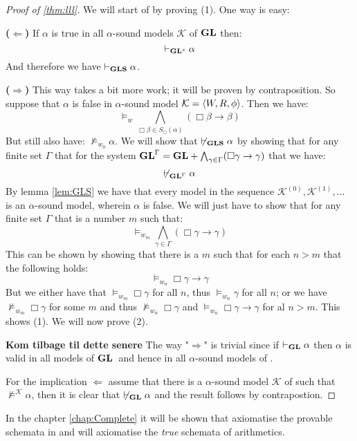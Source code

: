 \documentclass[../main.tex]{subfiles}
\begin{document}
\begin{proof}[Proof of \ref{thm:lll}]
	We will start of by proving (1). One way is easy:

	\textbf{($\Leftarrow$)} If $\alpha$ is true in all $\alpha$-sound
	models $\mathcal{K}$ of $\text{\textbf{GL}}$ then:
	$$\vdash_{\text{\textbf{GL}}^s}\alpha$$
	And therefore we have $\vdash_{\text{\textbf{GLS}}}\alpha$.

	\textbf{($\Rightarrow$)} This way takes a bit more work; it will be
	proven by contraposition. So suppose that $\alpha$ is false in
	$\alpha$-sound model $\mathcal{K}=\langle W,R,\phi\rangle$. Then we have:
	$$\vDash_w\bigwedge_{\Box\beta\in
	S_\Box(\alpha)}(\Box\beta\rightarrow\beta)$$
	But still also have: $\not\vDash_{w_0}\alpha$. We will show that
	$\not\vdash_{\text{\textbf{GLS}}}\alpha$ by showing that for any finite set $\Gamma$
	that for the system
	$\text{\textbf{GL}}^\Gamma=\text{\textbf{GL}}+\bigwedge_{\gamma\in\Gamma}(\Box\gamma\rightarrow\gamma)$
	that we have:
	$$\not\vdash_{\text{\textbf{GL}}^\Gamma}\alpha$$
	By lemma \ref{lem:GLS} we have that every  model in the sequence
	$\mathcal{K}^{(0)},\mathcal{K}^{(1)},\ldots$ is an $\alpha$-sound
	model, wherein $\alpha$ is false. We will just have to show that for
	any finite set $\Gamma$ that is a number $m$ such that:
	$$\vDash_{w_m}\bigwedge_{\gamma\in\Gamma}(\Box\gamma\rightarrow\gamma)$$
	This can be shown by showing that there is a $m$ such that for each
	$n>m$ that the following holds:
	$$\vDash_{w_n}\Box\gamma\rightarrow\gamma$$
	But we either have that $\vDash_{w_m}\Box\gamma$ for all $n$, thus
	$\vDash_{w_n}\gamma$ for all $n$; or we have
	$\not\vDash_{w_m}\Box\gamma$ for some $m$ and thus
	$\not\vDash_{w_n}\Box\gamma$ and
	$\vDash_{w_n}\Box\gamma\rightarrow\gamma$ for al $n>m$. This shows (1).
	We will now prove (2).

	\textbf{Kom tilbage til dette senere}
	The way "$\Rightarrow$" is trivial since if $\vdash_{\text{\textbf{GL}}}\alpha$ then
	$\alpha$ is valid in all models of $\text{\textbf{GL}}$\ and hence in all
	$\alpha$-sound models of \GL.
	
	For the implication $\Leftarrow$ assume that there is a $\alpha$-sound model
	$\mathcal{K}$ of \GL such that $\not\vDash^\mathcal{K}\alpha$, then it
	is clear that $\not\vdash_{\text{\textbf{GL}}}\alpha$ and the result follows by
	contrapostion.
\end{proof}
In the chapter \ref{chap:Complete} it will be shown that \GL axiomatise the
provable schemata in \PRA and \GLS will axiomatise the \textit{true} schemata
of arithmetics.
\end{document}
